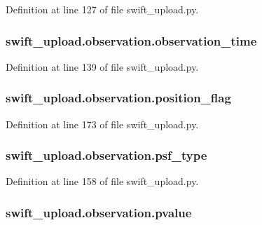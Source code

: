 Definition at line 127 of file swift\-\_\-upload.\-py.

\hypertarget{classswift__upload_1_1observation_a4dbc6c0a4f95d314d24df1dfa6a2fc75}{
\subsubsection[{observation\-\_\-time}]{\setlength{\rightskip}{0pt plus 5cm}swift\-\_\-upload.\-observation.\-observation\-\_\-time}}\label{classswift__upload_1_1observation_a4dbc6c0a4f95d314d24df1dfa6a2fc75}


Definition at line 139 of file swift\-\_\-upload.\-py.

\hypertarget{classswift__upload_1_1observation_a30be5bbc348a999af0238626c752fece}{
\subsubsection[{position\-\_\-flag}]{\setlength{\rightskip}{0pt plus 5cm}swift\-\_\-upload.\-observation.\-position\-\_\-flag}}\label{classswift__upload_1_1observation_a30be5bbc348a999af0238626c752fece}


Definition at line 173 of file swift\-\_\-upload.\-py.

\hypertarget{classswift__upload_1_1observation_a0116e190475703fb5b3d9b76304b203c}{
\subsubsection[{psf\-\_\-type}]{\setlength{\rightskip}{0pt plus 5cm}swift\-\_\-upload.\-observation.\-psf\-\_\-type}}\label{classswift__upload_1_1observation_a0116e190475703fb5b3d9b76304b203c}


Definition at line 158 of file swift\-\_\-upload.\-py.

\hypertarget{classswift__upload_1_1observation_adcc3e0fbb64d16bea5cf6fadf3928309}{
\subsubsection[{pvalue}]{\setlength{\rightskip}{0pt plus 5cm}swift\-\_\-upload.\-observation.\-pvalue}}\label{classswift__upload_1_1observation_adcc3e0fbb64d16bea5cf6fadf3928309}


